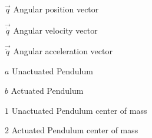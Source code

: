 \begin{Nomencl}
   	

   \item[$\overrightarrow{q}$] Angular position vector
   \item[$\overrightarrow{\dot{q}}$] Angular velocity vector
   \item[$\overrightarrow{\ddot{q}}$] Angular acceleration vector

   \item[$a$] 			Unactuated Pendulum
   \item[$b$]          	Actuated Pendulum
   \item[$1$]          	Unactuated Pendulum center of mass
   \item[$2$]          	Actuated Pendulum center of mass
\end{Nomencl}



\endinput
